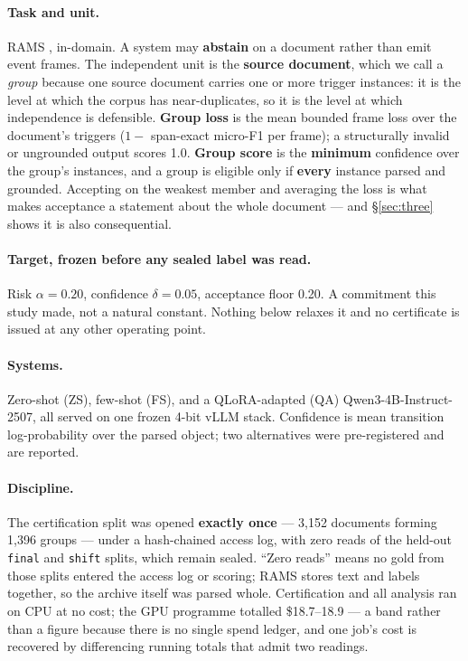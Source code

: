 \documentclass[11pt]{article}
\begin{document}
\paragraph{Task and unit.} RAMS \cite{ebner2020rams}, in-domain. A system may \textbf{abstain} on a
document rather than emit event frames. The independent unit is the \textbf{source document}, which
we call a \emph{group} because one source document carries one or more trigger instances: it is the
level at which the corpus has near-duplicates, so it is the level at which independence is
defensible. \textbf{Group loss} is the mean bounded frame loss over the document's triggers
($1 - $ span-exact micro-F1 per frame); a structurally invalid or ungrounded output scores 1.0.
\textbf{Group score} is the \textbf{minimum} confidence over the group's instances, and a group is
eligible only if \textbf{every} instance parsed and grounded. Accepting on the weakest member and
averaging the loss is what makes acceptance a statement about the whole document --- and
\S\ref{sec:three} shows it is also consequential.

\paragraph{Target, frozen before any sealed label was read.} Risk $\alpha = 0.20$, confidence
$\delta = 0.05$, acceptance floor 0.20. A commitment this study made, not a natural constant.
Nothing below relaxes it and no certificate is issued at any other operating point.

\paragraph{Systems.} Zero-shot (ZS), few-shot (FS), and a QLoRA-adapted (QA)
Qwen3-4B-Instruct-2507, all served on one frozen 4-bit vLLM stack. Confidence is mean transition
log-probability over the parsed object; two alternatives were pre-registered and are reported.

\paragraph{Discipline.} The certification split was opened \textbf{exactly once} --- 3,152
documents forming 1,396 groups --- under a hash-chained access log, with zero reads of the held-out
\texttt{final} and \texttt{shift} splits, which remain sealed. ``Zero reads'' means no gold from those splits
entered the access log or scoring; RAMS stores text and labels together, so the archive itself was
parsed whole. Certification and all analysis ran
on CPU at no cost; the GPU programme totalled \$18.7--18.9 --- a band rather than a figure because
there is no single spend ledger, and one job's cost is recovered by differencing running totals
that admit two readings.
\end{document}
